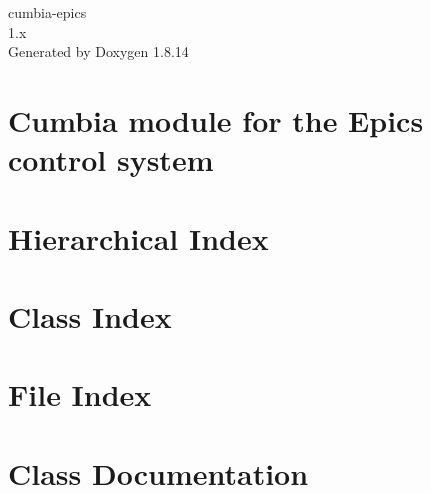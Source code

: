 \documentclass[twoside]{book}
\newcommand{\+}{\discretionary{\mbox{\scriptsize$\hookleftarrow$}}{}{}}
\newcommand{\clearemptydoublepage}{%
  \newpage{\pagestyle{empty}\cleardoublepage}%
}
\begin{document}
\begin{titlepage}
\vspace*{7cm}
\begin{center}%
{\Large cumbia-\/epics \\[1ex]\large 1.\+x }\\
\vspace*{1cm}
{\large Generated by Doxygen 1.8.14}\\
\end{center}
\end{titlepage}
\clearemptydoublepage
{}
\tableofcontents
\clearemptydoublepage
{}

\chapter{Cumbia module for the Epics control system}
\label{index}
\chapter{Hierarchical Index}

\chapter{Class Index}

\chapter{File Index}

\chapter{Class Documentation}




























\end{document}
